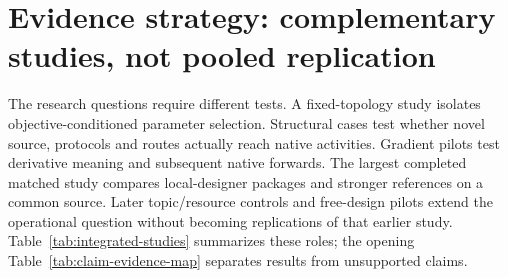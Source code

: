 \section{Evidence strategy: complementary studies, not pooled replication}
The research questions require different tests. A fixed-topology study isolates
objective-conditioned parameter selection. Structural cases test whether novel
source, protocols and routes actually reach native activities. Gradient pilots
test derivative meaning and subsequent native forwards. The largest completed
matched study compares local-designer packages and stronger references on a
common source. Later topic/resource controls and free-design pilots extend
the operational question without becoming replications of that earlier study.
Table~\ref{tab:integrated-studies} summarizes these roles; the opening
Table~\ref{tab:claim-evidence-map} separates results from unsupported claims.

